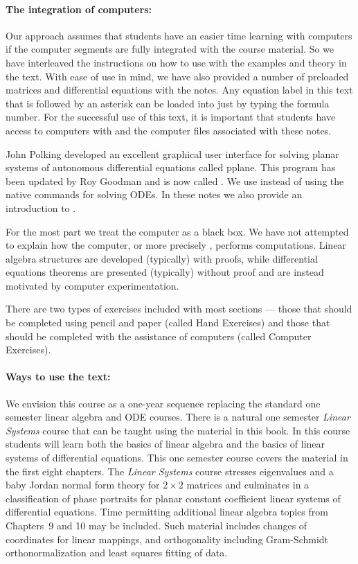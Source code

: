 \documentclass{ximera}
\begin{document}
\paragraph{The integration of computers:}  Our approach assumes that students 
have an easier time learning with 
computers if the computer segments are fully integrated with the course 
material.  So we have interleaved the instructions on how to use \Matlab 
with the examples and theory in the text.  With ease of use in mind, we 
have also provided a number of preloaded matrices and differential equations 
with the notes.  Any equation label in this text that is followed by an 
asterisk can be loaded into \Matlab just by typing the formula number.  For 
the successful use of this text, it is important that students have access 
to computers with \Matlab and the computer files associated with these notes.

John Polking developed an excellent graphical user interface for solving
planar systems of autonomous differential equations called {\textsf{pplane}}.  
This program has been updated by Roy Goodman and is now called {\pplane}.
We use {\pplane} instead of using the \Matlab native commands for solving ODEs. 
In these notes we also provide an introduction to {\pplane}. 

For the most part we treat the computer as a black box.  We have not
attempted to explain how the computer, or more precisely \Matlabp, 
performs computations.   Linear algebra structures are developed (typically) 
with proofs, while differential equations theorems are presented (typically) 
without proof and are instead motivated by computer experimentation.  

There are two types of exercises included with most sections --- those that 
should be completed using pencil and paper (called Hand Exercises) and 
those that should be completed with the assistance of computers (called 
Computer Exercises).  

\paragraph{Ways to use the text:}  We envision this course as a one-year 
sequence replacing the standard one semester linear algebra and ODE courses. 
There is a natural one semester {\em Linear Systems\/} course that can be 
taught using the material in this book. In this course students will
learn both the basics of linear algebra and the basics of linear systems of
differential equations.  This one semester course covers the material in the 
first eight chapters.  The {\em Linear Systems\/} course stresses eigenvalues 
and a baby Jordan normal form theory for $2\times 2$ matrices and culminates 
in a classification of phase portraits for planar constant coefficient linear 
systems of differential equations.   Time permitting additional linear 
algebra topics from Chapters~9 and 10 may be included.  Such material 
includes changes of coordinates for linear mappings, and orthogonality 
including Gram-Schmidt orthonormalization and least squares fitting of data.
\end{document}
